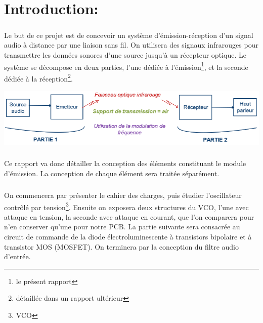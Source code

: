 \documentclass[a4paper]{report}
\begin{document}
\flushleft        
\newpage

\setcounter{tocdepth}{3}
\tableofcontents



\newpage


\flushleft
	
\chapter*{Introduction:}



\paragraph{}
Le but de ce projet est de concevoir un système d’émission-réception d'un signal audio à distance par une liaison sans fil. On utilisera des signaux infrarouges pour transmettre les données sonores d’une source jusqu’à un récepteur optique. Le système se décompose en deux parties, l’une dédiée à l’émission\footnote{le présent rapport}, et la seconde dédiée à la réception\footnote{détaillée dans un rapport ultérieur}.\\

\vspace{1cm}

\begin{center}
\includegraphics[width=1\textwidth]{parties.PNG}
\end{center}

\vspace{1cm}

\paragraph{} 
Ce rapport va donc détailler la conception des éléments constituant le module d’émission. La conception de chaque élément sera traitée séparément.

\paragraph{} 
On commencera par présenter le cahier des charges, puis étudier l'oscillateur contrôlé par tension\footnote{VCO}. Ensuite on exposera deux structures du VCO, l’une avec attaque en tension, la seconde avec attaque en courant, que l’on comparera pour n’en conserver qu’une  pour notre PCB. La partie suivante sera consacrée au circuit de commande de la diode électroluminescente à transistors bipolaire et à transistor MOS (MOSFET). On terminera par la conception du filtre audio d’entrée.\\
\end{document}
